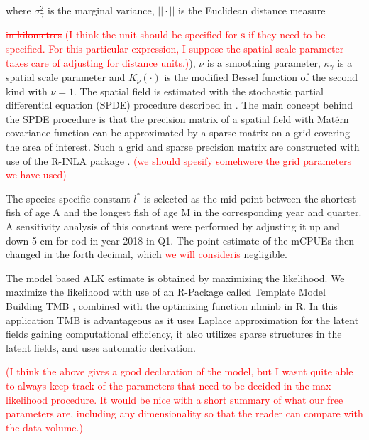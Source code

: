 \documentclass[a4paper 12pt]{article}
\numberwithin{equation}{section}
\newcommand{\ed}[1]{\textcolor{red}{#1}}
\begin{document}
where $\sigma^2_{\gamma}$ is the marginal variance, $||\cdot||$ is the Euclidean distance measure {\ed{\sout{in kilometres} (I think the unit should be specified for $\mathbf{s}$ if they need to be specified. For this particular expression, I suppose the spatial scale parameter takes care of adjusting for distance units.)}), $\nu$ is a smoothing parameter, $\kappa_{\gamma}$ is a spatial scale parameter and $K_{\nu}(\cdot)$ is the modified Bessel function of the second kind with $\nu = 1$. The spatial field is estimated with the stochastic partial differential equation (SPDE) procedure described in \citet{lindgren2011explicit}. The main concept behind the SPDE procedure is that the precision matrix of a spatial field with Mat\'{e}rn  covariance function can be approximated by a sparse matrix on a grid covering the area of interest. Such a grid and sparse precision matrix are constructed with use of the R-INLA package \citep{rue2009approximate}. \ed{(we should spesify somehwere the grid parameters we have used)}

The species specific constant $l^*$ is selected as the mid point between the shortest fish of age A and the longest fish of age M in the corresponding year and quarter. A sensitivity analysis of this constant were performed by adjusting it up and down 5 cm for cod in year 2018 in Q1. The point estimate of the mCPUEs then changed in the forth decimal, which \ed{we will consider\sout{is}} negligible.

The model based ALK estimate is obtained by maximizing the likelihood. We maximize the likelihood with use of an R-Package called Template Model Building {\sffamily TMB} \citep{kristensen2015tmb}, combined with the optimizing function {\sffamily nlminb} in R. In this application {\sffamily TMB} is advantageous as it uses Laplace approximation for the latent fields gaining computational efficiency, it also utilizes sparse structures in the latent fields, and uses automatic derivation. 

\ed{(I think the above gives a good declaration of the model, but I wasnt quite able to always keep track of the parameters that need to be decided in the max-likelihood procedure. It would be nice with a short summary of what our free parameters are, including any dimensionality so that the reader can compare with the data volume.)}

}
\end{document}
